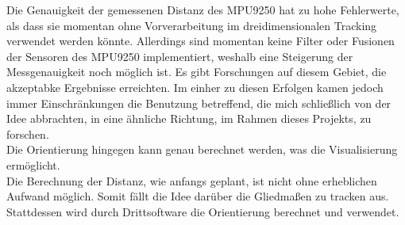 Die Genauigkeit der gemessenen Distanz des MPU9250 hat zu hohe Fehlerwerte, als 
dass sie momentan ohne Vorverarbeitung im dreidimensionalen Tracking verwendet werden könnte.
Allerdings sind momentan keine Filter oder Fusionen der Sensoren des MPU9250 implementiert,
weshalb eine Steigerung der Messgenauigkeit noch möglich ist. Es gibt Forschungen auf diesem Gebiet,
die akzeptabke Ergebnisse erreichten. Im einher zu diesen Erfolgen kamen jedoch immer Einschränkungen 
die Benutzung betreffend, die mich schließlich von der Idee abbrachten, in eine ähnliche Richtung, 
im Rahmen dieses Projekts, zu forschen.\\
Die Orientierung hingegen kann genau berechnet werden, was die Visualisierung ermöglicht.\\
Die Berechnung der Distanz, wie anfangs geplant, ist nicht ohne erheblichen Aufwand möglich.
Somit fällt die Idee darüber die Gliedmaßen zu tracken aus. Stattdessen wird durch Drittsoftware
die Orientierung berechnet und verwendet.